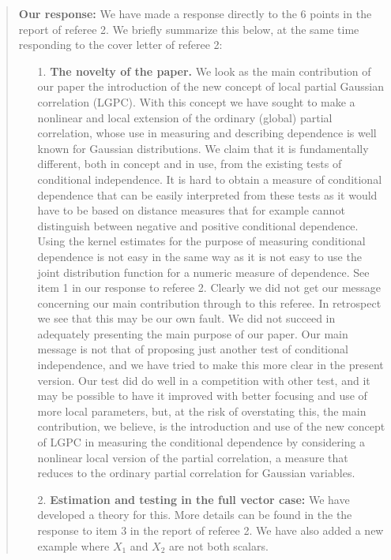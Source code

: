 \documentclass[
  12pt,
  letterpaper]{article}
\numberwithin{equation}{section}
\begin{document}
\begin{quote}
\textbf{Our response:} We have made a response directly to the 6 points in the report of referee 2. We briefly summarize this below, at the same time responding to the cover letter of referee 2:

\begin{itemize}
\item[1.] \textbf{The novelty of the paper.} We look as the main contribution of our paper the introduction of the new concept of local partial Gaussian correlation (LGPC). With this concept we have sought to make a nonlinear and local extension of the ordinary (global) partial correlation, whose use in measuring and describing dependence is well known for Gaussian distributions. We claim that it is fundamentally different, both in concept and in use, from the existing tests of conditional independence. It is hard to obtain a measure of conditional dependence that can be easily interpreted from these tests as it would have to be based on distance measures that for example cannot distinguish between negative and positive conditional dependence.
\vspace{.3cm} \newline 
Using the kernel estimates for the purpose of measuring conditional dependence is not easy in the same way as it is not easy to use the joint distribution function for a numeric measure of dependence. See item 1 in our response to referee 2. 
\vspace{.3cm} \newline 
Clearly we did not get our message concerning our main contribution through to this referee. In retrospect we see that this may be our own fault. We did not succeed in adequately presenting the main purpose of our paper. Our main message is not that of proposing just another test of conditional independence,
and we have tried to make this more clear in the present version. Our test did do well in a competition with other test, and it may be possible to have it improved with better focusing and use of more local parameters, but, at the risk of overstating this, the main contribution, we believe, is the introduction and use of the new concept of LGPC in measuring the conditional dependence by considering a nonlinear local version of the partial correlation, a measure that reduces to the ordinary partial correlation for Gaussian variables.
\item [2.] \textbf{Estimation and testing in the full vector case:} 
We have developed a theory for this. More details can be found in the the response to item 3 in the report of referee 2. We have also added a new example where $X_1$ and $X_2$ are not both scalars.

\end{itemize}
\end{quote}
\end{document}
